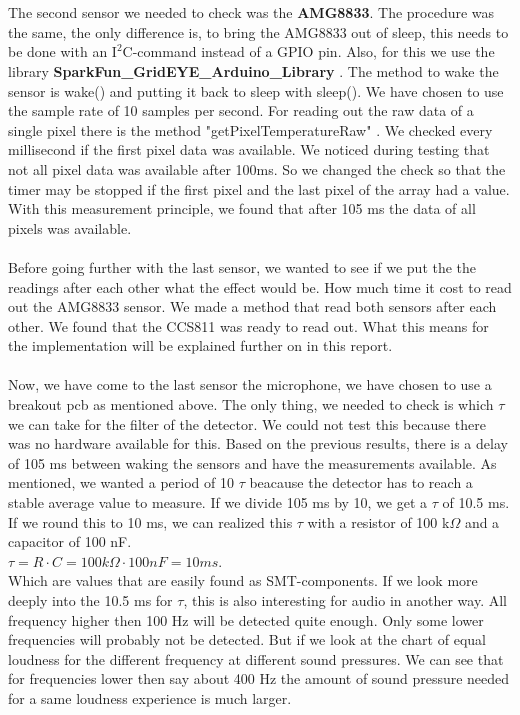 \documentclass[11pt,a4paper]{article}
\begin{document}
\\ \\
The second sensor we needed to check was the \textbf{AMG8833}. The procedure was the same, the only difference is, to bring the AMG8833 out of sleep, this needs to be done with an $\text{I}^2$C-command instead of a GPIO pin. Also, for this we use the library \textbf{SparkFun\_GridEYE\_Arduino\_Library} \cite{lib_AMG8833} . The method to wake the sensor is wake() and putting it back to sleep with sleep(). We have chosen to use the sample rate of 10 samples per second. For reading out the raw data of a single pixel there is the method "getPixelTemperatureRaw" \cite{lib_AMG8833} . We checked every millisecond if the first pixel data was available. We noticed during testing that not all pixel data was available after 100ms. So we changed the check so that the timer may be stopped if the first pixel and the last pixel of the array had a value. With this measurement principle, we found that after 105 ms the data of all pixels was available.
\\ \\  
Before going further with the last sensor, we wanted to see if we put the the readings after each other what the effect would be. How much time it cost to read out the AMG8833 sensor. We made a method that read both sensors after each other. We found that the CCS811 was ready to read out. What this means for the implementation will be explained further on in this report. 
\\  \\ Now, we have come to the last sensor the microphone, we have chosen to use a breakout pcb as mentioned above. The only thing, we needed to check is which $\tau$ we can take for the filter of the detector. We could not test this because there was no hardware available for this. Based on the previous results, there is a delay of 105 ms between waking the sensors and have the measurements available. As mentioned, we wanted a period of 10 $\tau$ beacause the detector has to reach a stable average value to measure. If we divide 105 ms  by 10, we get  a $\tau$ of 10.5 ms. If we round this to 10 ms, we can realized this $\tau$ with a resistor of 100 k$\Omega$ and a capacitor of 100 nF.\\
$\tau= R \cdot C =  100 k\Omega \cdot 100 nF= 10 ms$.\\
Which are values that are easily found as SMT-components. If we look more deeply into the 10.5 ms for $\tau$, this is also interesting for audio in another way. All frequency higher then 100 Hz will be detected quite enough. Only some lower frequencies will probably not be detected. But if we look at the chart of equal loudness for the different frequency at different sound pressures. We can see that for frequencies lower then say about 400 Hz the amount of sound pressure needed for a same loudness experience is much larger. 
\end{document}

